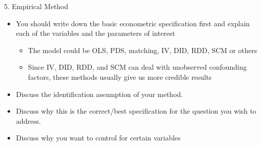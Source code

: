 \documentclass[dvipsnames,hyperref={pdfpagelabels=false}]{beamer}
\begin{document}
\begin{frame}{5. Empirical Method}
	\begin{itemize} 
		
		\item You should write down the basic econometric specification first and explain each of the variables and the parameters of interest
		\vspace{0.2cm}
		\begin{itemize} 
			\item The model could be OLS, PDS, matching, IV, DID, RDD, SCM or others
			\vspace{0.2cm}
			\item Since IV, DID, RDD, and SCM can deal with unobserved confounding factors, these methods usually give us more credible results
		\end{itemize}
		\vspace{0.2cm}
		\item Discuss the identification assumption of your method.
		\vspace{0.2cm}
		\item Discuss why this is the correct/best specification for the
		question you wish to address.
		\vspace{0.2cm}
		\item Discuss why you want to control for certain variables
		
		
	\end{itemize}
	
	
	
\end{frame}
\end{document}
